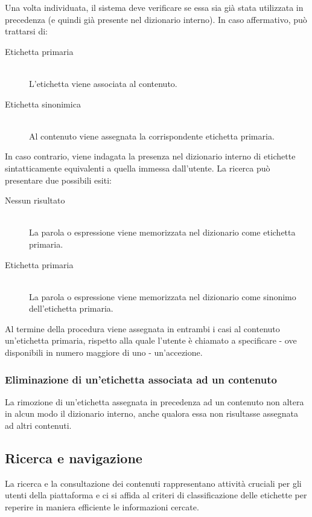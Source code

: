 \documentclass[10pt,a4paper,headinclude,footinclude,hidelinks]{scrreprt} %
\begin{document}
	Una volta individuata, il sistema deve verificare se essa sia già stata utilizzata in precedenza (e quindi già presente nel dizionario interno). In caso affermativo, può trattarsi di:
	\begin{description}
	\item[Etichetta primaria] \hfill \\
	L'etichetta viene associata al contenuto.
	\item[Etichetta sinonimica] \hfill \\
	Al contenuto viene assegnata la corrispondente etichetta primaria.
	\end{description}

	In caso contrario, viene indagata la presenza nel dizionario interno di etichette sintatticamente equivalenti a quella immessa dall'utente. La ricerca può presentare due possibili esiti:
	\begin{description}
	\item[Nessun risultato] \hfill \\
	La parola o espressione viene memorizzata nel dizionario come etichetta primaria.
	\item[Etichetta primaria] \hfill \\
	La parola o espressione viene memorizzata nel dizionario come sinonimo dell'etichetta primaria.
	\end{description}

	Al termine della procedura viene assegnata in entrambi i casi al contenuto un'etichetta primaria, rispetto alla quale l'utente è chiamato a specificare - ove disponibili in numero maggiore di uno - un'accezione.
	\subsubsection{Eliminazione di un'etichetta associata ad un contenuto}
	La rimozione di un'etichetta assegnata in precedenza ad un contenuto non altera in alcun modo il dizionario interno, anche qualora essa non risultasse assegnata ad altri contenuti.

	\subsection{Ricerca e navigazione}
	\label{sec:stage:req:ricerca}
	La ricerca e la consultazione dei contenuti rappresentano attività cruciali per gli utenti della piattaforma e ci si affida al criteri di classificazione delle etichette per reperire in maniera efficiente le informazioni cercate.
\end{document}
